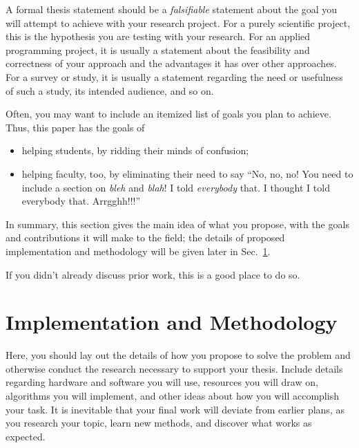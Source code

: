A formal thesis statement should be a \emph{falsifiable} statement about
the goal you will attempt to achieve with your research project.
For a purely scientific project, this is the hypothesis you are testing
with your research.  For an applied programming project, it is usually a
statement about the feasibility and correctness of your approach and
the advantages it has over other approaches.  For a survey or study,
it is usually a statement regarding the need or usefulness of such
a study, its intended audience, and so on.

Often, you may want to include an itemized list of goals you plan to
achieve.  Thus, this paper has the goals of
\begin{itemize}
\item
helping students, by ridding their minds of confusion;
\item
helping faculty, too, by eliminating their need to say ``No, no, no!
You need to include a section on \emph{bleh} and \emph{blah}!
I told \emph{everybody} that.  I thought I told everybody that.  Arrgghh!!!''
\end{itemize}
In summary, this section gives the main idea of what you propose,
with the goals and contributions it will make to the field; the
details of proposed implementation and methodology will be given later
in Sec.~\ref{sec:implem}.


If you didn't already discuss prior work, this is a good place to do so.

\section{Implementation and Methodology}\label{sec:implem}

Here, you should lay out the details of how you propose to solve the
problem and otherwise conduct the research necessary to support your
thesis.  Include details regarding hardware and software you will use,
resources you will draw on, algorithms you will implement, and other
ideas about how you will accomplish your task.  It is inevitable that
your final work will deviate from earlier plans, as you research your
topic, learn new methods, and discover what works as expected.

